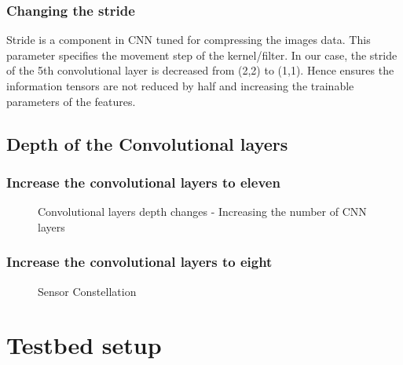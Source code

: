 \subsubsection*{Changing the stride}
Stride is a component in CNN tuned for compressing the images data. This parameter
specifies the movement step of the kernel/filter. In our case, the stride of the 5th
convolutional layer is decreased from (2,2) to (1,1). Hence ensures the information
tensors are not reduced by half and increasing the trainable parameters of the features.

\subsection{Depth of the Convolutional layers}
\subsubsection*{Increase the convolutional layers to eleven}
\begin{figure}[!ht]
	\centering
    \def\svgwidth{1.15\textwidth}
    \caption{Convolutional layers depth changes - Increasing the number of CNN layers}
    \label{fig:convlayerschange3}
\end{figure}
\subsubsection*{Increase the convolutional layers to eight}

\iffalse
\begin{figure}[!ht]
	\centering
    \def\svgwidth{\textwidth}
    \caption{Sensor Constellation}
    \label{fig:simplesensorconstellation}
\end{figure}
\section{Testbed setup}

